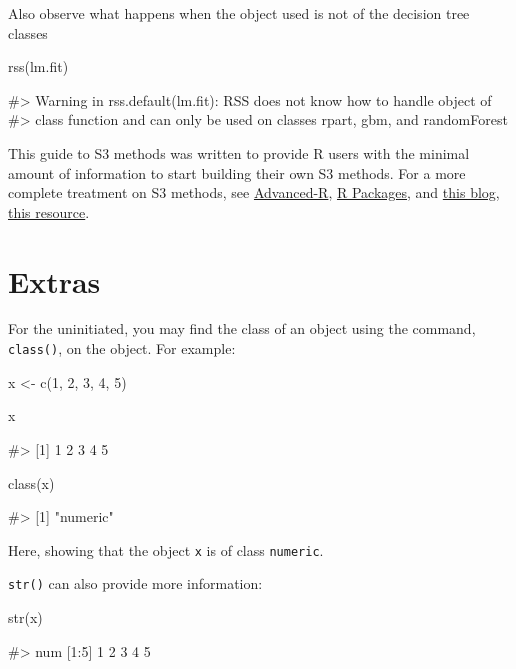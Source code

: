 Also observe what happens when the object used is not of the decision
tree classes

\begin{Schunk}
\begin{Sinput}
rss(lm.fit)
\end{Sinput}
\begin{Soutput}
#> Warning in rss.default(lm.fit): RSS does not know how to handle object of
#> class function and can only be used on classes rpart, gbm, and randomForest
\end{Soutput}
\end{Schunk}

This guide to S3 methods was written to provide R users with the minimal
amount of information to start building their own S3 methods. For a more
complete treatment on S3 methods, see \href{}{Advanced-R}, \href{}{R
Packages}, and \href{}{this blog}, \href{}{this resource}.

\section{Extras}\label{extras}

For the uninitiated, you may find the class of an object using the
command, \texttt{class()}, on the object. For example:

\begin{Schunk}
\begin{Sinput}
x <- c(1, 2, 3, 4, 5)

x
\end{Sinput}
\begin{Soutput}
#> [1] 1 2 3 4 5
\end{Soutput}
\begin{Sinput}
class(x)
\end{Sinput}
\begin{Soutput}
#> [1] "numeric"
\end{Soutput}
\end{Schunk}

Here, showing that the object \texttt{x} is of class \texttt{numeric}.

\texttt{str()} can also provide more information:

\begin{Schunk}
\begin{Sinput}
str(x)
\end{Sinput}
\begin{Soutput}
#>  num [1:5] 1 2 3 4 5
\end{Soutput}
\end{Schunk}

